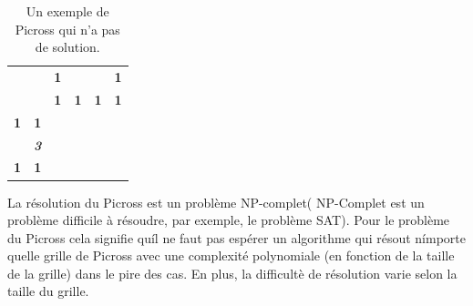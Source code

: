 \documentclass{article}
\begin{document}
\begin{table}[h]
\centering
\begin{tabular}{lccccc}
                                           & \multicolumn{1}{l}{}                                             & \multicolumn{1}{l}{\textbf{1}}                                                & \multicolumn{1}{l}{\textbf{}}                                                 & \multicolumn{1}{l}{\textbf{}}                                                 & \multicolumn{1}{l}{\textbf{1}}                                                \\
                                           & \cellcolor[HTML]{FFFFFF}\textbf{}                                & \cellcolor[HTML]{FFFFFF}\textbf{1}                                            & \cellcolor[HTML]{FFFFFF}\textbf{1}                                            & \cellcolor[HTML]{FFFFFF}\textbf{1}                                            & \cellcolor[HTML]{FFFFFF}\textbf{1}                                            \\ \cline{3-6} 
\textbf{1}                                 & \multicolumn{1}{c|}{\cellcolor[HTML]{FFFFFF}\textbf{1}}          & \multicolumn{1}{c|}{\cellcolor[HTML]{000000}\textbf{}}                        & \multicolumn{1}{c|}{\cellcolor[HTML]{FFFFFF}\textbf{}}                        & \multicolumn{1}{c|}{\cellcolor[HTML]{FFFFFF}\textbf{}}                        & \multicolumn{1}{c|}{\cellcolor[HTML]{000000}{\color[HTML]{000000} \textbf{}}} \\ \cline{3-6} 
\cellcolor[HTML]{FFFFFF}\textit{\textbf{}} & \multicolumn{1}{c|}{\cellcolor[HTML]{FFFFFF}\textit{\textbf{3}}} & \multicolumn{1}{c|}{\cellcolor[HTML]{9B9B9B}{\color[HTML]{000000} \textbf{}}} & \multicolumn{1}{c|}{\cellcolor[HTML]{000000}{\color[HTML]{000000} \textbf{}}} & \multicolumn{1}{c|}{\cellcolor[HTML]{000000}{\color[HTML]{000000} \textbf{}}} & \multicolumn{1}{c|}{\cellcolor[HTML]{9B9B9B}{\color[HTML]{000000} \textbf{}}} \\ \cline{3-6} 
\textbf{1}                                 & \multicolumn{1}{c|}{\cellcolor[HTML]{FFFFFF}\textbf{1}}          & \multicolumn{1}{c|}{\cellcolor[HTML]{000000}\textbf{}}                        & \multicolumn{1}{c|}{\cellcolor[HTML]{FFFFFF}\textbf{}}                        & \multicolumn{1}{c|}{\cellcolor[HTML]{FFFFFF}\textbf{}}                        & \multicolumn{1}{c|}{\cellcolor[HTML]{000000}\textbf{}}                        \\ \cline{3-6} 
\end{tabular}
\caption{Un exemple de Picross qui n'a pas de solution.}
\end{table}
\newpage
La r\'esolution du Picross est un probl\`eme NP-complet( NP-Complet est un probl\`eme difficile \`a r\'esoudre, par exemple, le probl\`eme SAT). Pour le probl\`eme du Picross cela signifie qu\'il ne faut pas esp\'erer un algorithme qui r\'esout n\'importe quelle grille de Picross avec une complexit\'e polynomiale (en fonction de la taille de la grille) dans le pire des cas. En plus, la difficult\`e de r\'esolution varie selon la taille du grille.
\end{document}
